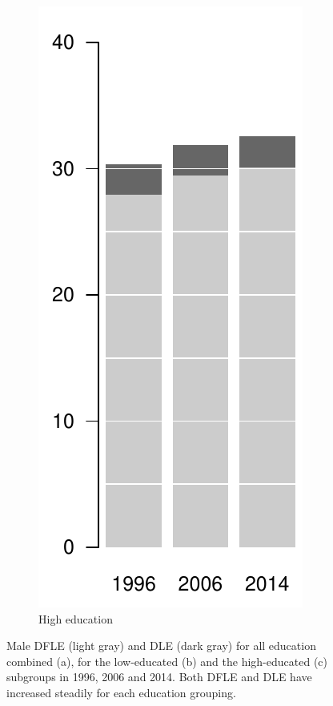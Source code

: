 \begin{figure}[ht!]
\begin{subfigure}[b]{0.2\textwidth}
        \includegraphics[scale=.5]{Figures/bar_male_uni.pdf}
        \caption{High education}
    \end{subfigure}
    \caption{Male DFLE (light gray) and DLE (dark gray) for all education combined (a), for the low-educated (b) and the high-educated (c) subgroups in 1996, 2006 and 2014. Both DFLE and DLE have increased steadily for each education grouping.}\label{fig:barsmales}
\end{figure}

